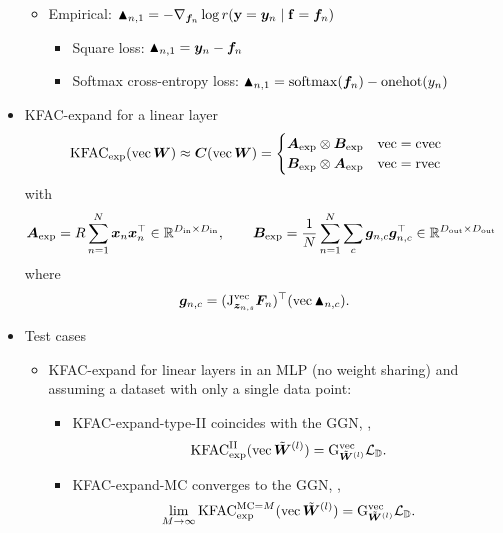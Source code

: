 \begin{itemize}
\begin{itemize}
    \item Empirical: $\blacktriangle_{n,1} = - \nabla_{{\bm{f}}_n} \log r({\mathbf{y}} = {\bm{y}}_n \mid {\mathbf{f}} = {\bm{f}}_n)$
      \begin{itemize}
      \item Square loss: $\blacktriangle_{n,1} = {\bm{y}}_n - {\bm{f}}_n$
      \item Softmax cross-entropy loss: $\blacktriangle_{n,1} = \mathrm{softmax}({\bm{f}}_n) - \mathrm{onehot}(y_n)$
      \end{itemize}
    \end{itemize}
  \item KFAC-expand for a linear layer
    \begin{align*}
      &\mathrm{KFAC}_{\text{exp}}(\operatorname{vec} {\bm{W}}) \approx {\bm{C}}(\operatorname{vec} {\bm{W}})
      =
        \begin{cases}
          {\bm{A}}_{\text{exp}} \otimes {\bm{B}}_{\text{exp}} & \operatorname{vec} = \operatorname{cvec}
          \\
          {\bm{B}}_{\text{exp}} \otimes {\bm{A}}_{\text{exp}} & \operatorname{vec} = \operatorname{rvec}
        \end{cases}\,
    \end{align*}
    with
    \begin{align*} 
      {\bm{A}}_{\text{exp}} = R \sum_{n=1}^N {\bm{x}}_{n} {\bm{x}}_{n}^{\top} \in {\mathbb{R}}^{D_{\text{in}} \times D_{\text{in}}}, \qquad
      {\bm{B}}_{\text{exp}} &= \frac{1}{N}\sum_{n=1}^N \sum_c {\bm{g}}_{n,c} {\bm{g}}_{n,c}^{\top}  \in {\mathbb{R}}^{D_{\text{out}} \times D_{\text{out}}}
    \end{align*}
    where
    \begin{align*}
    {\bm{g}}_{n,c} = (\mathrm{J}_{{\bm{z}}_{n,s}}^{\operatorname{vec}}{\bm{F}}_n)^{\top} (\operatorname{vec} \blacktriangle_{n,c}).
    \end{align*}
  \item Test cases
    \begin{itemize}
      \item KFAC-expand for linear layers in an MLP (no weight sharing) and assuming a dataset with only a single data point:
        \begin{itemize}
          \item KFAC-expand-type-II coincides with the GGN, \ie,
            \begin{align*}
              \mathrm{KFAC}^{\text{II}}_{\text{exp}}(\operatorname{vec}\tilde{{\bm{W}}}^{(l)}) = \mathrm{G}^{\operatorname{vec}}_{\tilde{{\bm{W}}}^{(l)}}{\mathcal{L}}_{{\mathbb{D}}}.
            \end{align*}
          \item KFAC-expand-MC converges to the GGN, \ie,
            \begin{align*}
              \lim_{M \to \infty} \kfac^{\text{MC}=M}_{\text{exp}}(\vec\tilde{\mW}^{(l)}) = \ggn^{\vec}_{\tilde{\mW}^{(l)}}\gL_{\sD}.

\end{align*}
\end{itemize}
\end{itemize}
\end{itemize}
